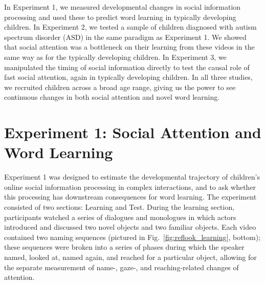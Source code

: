 \documentclass{pnastwo}
\begin{document}
\begin{article}
In Experiment 1, we measured developmental changes in social information processing and used these to predict word learning in typically developing children. In Experiment 2, we tested a sample of children diagnosed with autism spectrum disorder (ASD) in the same paradigm as Experiment 1. We showed that social attention was a bottleneck on their learning from these videos in the same way as for the typically developing children. In Experiment 3, we manipulated the timing of social information directly to test the causal role of fast social attention, again in typically developing children. In all three studies, we recruited children across a broad age range, giving us the power to see continuous changes in both social attention and novel word learning.

\section{Experiment 1: Social Attention and Word Learning}

Experiment 1 was designed to estimate the developmental trajectory of children's online social information processing in complex interactions, and to ask whether this processing has downstream consequences for word learning. The experiment consisted of two sections: Learning and Test. During the learning section, participants watched a series of dialogues and monologues in which actors introduced and discussed two novel objects and two familiar objects. Each video contained two naming sequences (pictured in Fig.~\ref{fig:reflook_learning}, bottom); these sequences were broken into a series of phases during which the speaker named, looked at, named again, and reached for a particular object, allowing for the separate measurement of name-, gaze-, and reaching-related changes of attention.


\end{article}
\end{document}
